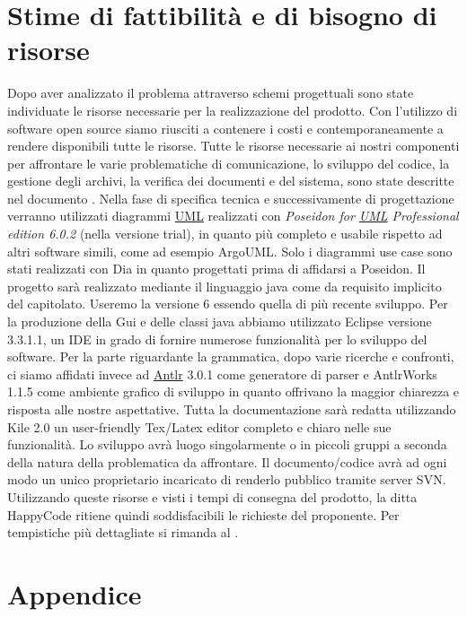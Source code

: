 \chapter{Stime di fattibilit\`a e di bisogno di risorse}
Dopo aver analizzato il problema attraverso schemi progettuali sono state individuate le risorse necessarie per la realizzazione del prodotto. Con l'utilizzo di software open source siamo riusciti a contenere i costi e contemporaneamente a rendere disponibili tutte le risorse.
Tutte le risorse necessarie ai nostri componenti per affrontare le varie problematiche di comunicazione, lo sviluppo del codice, la gestione degli archivi, la verifica dei documenti e del sistema, sono state descritte nel documento \PdQ.
Nella fase di specifica tecnica e successivamente di progettazione verranno utilizzati diagrammi \underline{UML} realizzati con \textit{Poseidon for \underline{UML} Professional edition 6.0.2} (nella versione trial), in quanto pi\`u completo e usabile rispetto ad altri software simili, come ad esempio ArgoUML. Solo i diagrammi use case sono stati realizzati con Dia in quanto progettati prima di affidarsi a Poseidon.
Il progetto sar\`a realizzato mediante il linguaggio java come da requisito implicito del capitolato. Useremo la versione 6 essendo quella di pi\`u recente sviluppo.
Per la produzione della Gui e delle classi java abbiamo utilizzato Eclipse versione 3.3.1.1, un IDE in grado di fornire numerose funzionalit\`a per lo sviluppo del software.
Per la parte riguardante la grammatica, dopo varie ricerche e confronti, ci siamo affidati invece ad \underline{Antlr} 3.0.1 come generatore di parser e AntlrWorks 1.1.5 come ambiente grafico di sviluppo in quanto offrivano la maggior chiarezza e risposta alle nostre aspettative.
Tutta la documentazione sar\`a redatta utilizzando Kile 2.0 un user-friendly Tex/Latex editor completo e chiaro nelle sue funzionalit\`a.
Lo sviluppo avr\`a luogo singolarmente o in piccoli gruppi a seconda della natura della problematica da affrontare.
Il documento/codice avr\`a ad ogni modo un unico proprietario incaricato di renderlo pubblico tramite server SVN.
Utilizzando queste risorse e visti i tempi di consegna del prodotto, la ditta HappyCode ritiene quindi soddisfacibili le richieste del proponente.
Per tempistiche pi\`u dettagliate si rimanda al \PdP.

\chapter{Appendice}
